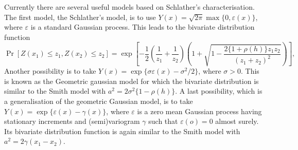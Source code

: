 \documentclass{article}
\begin{document}
Currently there are several useful models based on Schlather's
characterisation. The first model, the Schlather's model, is to use
$Y(x) = \sqrt{2 \pi} \max \{0, \varepsilon(x)\}$, where $\varepsilon$
is a standard Gaussian process. This leads to the bivariate
distribution function
\begin{equation}
  \label{eq:schlatherCDF}
  \Pr[Z(x_1) \leq z_1, Z(x_2) \leq z_2] = \exp\left[-\frac{1}{2}
    \left(\frac{1}{z_1} + \frac{1}{z_2} \right) \left(1 + \sqrt{1 -
        \frac{2 \{1 + \rho(h) \} z_1 z_2}{(z_1 +z_2)^2}} \right)
  \right],
\end{equation}
Another possibility is to take $Y(x) = \exp\{ \sigma \varepsilon(x) -
\sigma^2 / 2\}$, where $\sigma > 0$. This is known as the Geometric
gaussian model for which the bivariate distribution is similar to the
Smith model with $a^2 = 2 \sigma^2 \{1 - \rho(h)\}$. A last
possibility, which is a generalisation of the geometric Gaussian
model, is to take $Y(x) = \exp\{\varepsilon(x) - \gamma(x)\}$, where
$\varepsilon$ is a zero mean Gaussian process having stationary
increments and (semi)variogram $\gamma$ such that $\varepsilon(o) = 0$
almost surely. Its bivariate distribution function is again similar to
the Smith model with $a^2 = 2 \gamma(x_1 - x_2)$.
\end{document}
